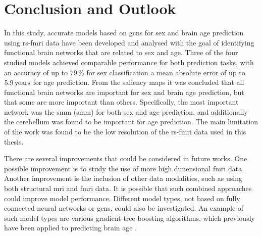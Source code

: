 

\chapter{Conclusion and Outlook}

In this study, accurate models based on \acrshort{gcn}s for sex and brain age prediction using \acrshort{rs-fmri} data have been developed and analysed with the goal of identifying functional brain networks that are related to sex and age. Three of the four studied models achieved comparable performance for both prediction tasks, with an accuracy of up to $79\,\%$ for sex classification a mean absolute error of up to $5.9\rm\,years$ for age prediction. From the saliency maps it was concluded that all functional brain networks are important for sex and brain age prediction, but that some are more important than others. Specifically, the most important network was the \acrlong{smm} (\acrshort{smm}) for both sex and age prediction, and additionally the cerebellum was found to be important for age prediction. The main limitation of the work was found to be the low resolution of the \acrshort{rs-fmri} data used in this thesis.

There are several improvements that could be considered in future works. One possible improvement is to study the use of more high dimensional \acrshort{fmri} data. Another improvement is the inclusion of other data modalities, such as using both structural \acrshort{mri} and \acrshort{fmri} data. It is possible that such combined approaches could improve model performance. Different model types, not based on fully connected neural networks or \acrshort{gcn}s, could also be investigated. An example of such model types are various gradient-tree boosting algorithms, which previously have been applied to predicting brain age \cite{kaufmann}.


